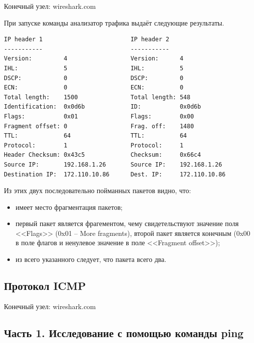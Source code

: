\documentclass[12pt, a4paper] {ncc}
\begin{document}
    Конечный узел: wireshark.com

    При запуске команды анализатор трафика выдаёт следующие результаты.
    \begin{verbatim}
IP header 1                         IP header 2
-----------                         -----------
Version:         4                  Version:      4
IHL:             5                  IHL:          5
DSCP:            0                  DSCP:         0
ECN:             0                  ECN:          0
Total length:    1500               Total length: 548
Identification:  0x0d6b             ID:           0x0d6b
Flags:           0x01               Flags:        0x00
Fragment offset: 0                  Frag. off:    1480
TTL:             64                 TTL:          64
Protocol:        1                  Protocol:     1
Header Checksum: 0x43c5             Checksum:     0x66c4
Source IP:       192.168.1.26       Source IP:    192.168.1.26
Destination IP:  172.110.10.86      Dest. IP:     172.110.10.86
    \end{verbatim}
    
    Из этих двух последовательно пойманных пакетов видно, что:
    \begin{itemize}
        \item имеет место фрагментация пакетов;
        \item первый пакет является фрагементом, чему свидетельствуют значение
              поля <<Flags>> (0x01 -- More fragments), второй пакет является конечным
              (0x00 в поле флагов и ненулевое значение в поле <<Fragment offset>>);
        \item из всего указанного следует, что пакета всего два.
    \end{itemize}

    \subsection*{Протокол ICMP}
    Конечный узел: wireshark.com
        \subsection*{Часть 1. Исследование с помощью команды ping}
        
\end{document}
